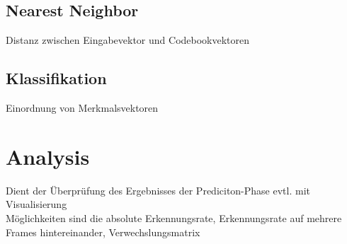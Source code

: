 \subsection{Nearest Neighbor}
Distanz zwischen Eingabevektor und Codebookvektoren
\subsection{Klassifikation}
Einordnung von Merkmalsvektoren

\section{Analysis}
Dient der Überprüfung des Ergebnisses der Prediciton-Phase evtl. mit Visualisierung\\
Möglichkeiten sind die absolute Erkennungsrate, Erkennungsrate auf mehrere Frames hintereinander, Verwechslungsmatrix
